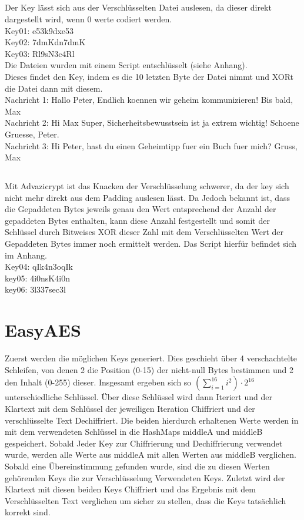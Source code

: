 \documentclass[12pt]{article}
\theoremstyle{plain}
\begin{document}
\subsection{}
Der Key lässt sich aus der Verschlüsselten Datei auslesen, da dieser direkt dargestellt wird, wenn 0 werte codiert werden.\\
Key01: e53k9dxe53\\
Key02: 7dmKdn7dmK\\
Key03: Rl9sN3c4Rl\\
Die Dateien wurden mit einem Script entschlüsselt (siehe Anhang).\\
Dieses findet den Key, indem es die 10 letzten Byte der Datei nimmt und XORt die Datei dann mit diesem.\\
Nachricht 1: Hallo Peter, Endlich koennen wir geheim kommunizieren! Bis bald, Max\\
Nachricht 2: Hi Max Super, Sicherheitsbewusstsein ist ja extrem wichtig! Schoene Gruesse, Peter.\\
Nachricht 3: Hi Peter, hast du einen Geheimtipp fuer ein Buch fuer mich? Gruss, Max\\
\subsection{}
Mit Advazicrypt ist das Knacken der Verschlüsselung schwerer, da der key sich nicht mehr direkt aus dem Padding auslesen lässt. Da Jedoch bekannt ist, dass die Gepaddeten Bytes jeweils genau den Wert entsprechend der Anzahl der gepaddeten Bytes enthalten, kann diese Anzahl festgestellt und somit der Schlüssel durch Bitweises XOR dieser Zahl mit dem Verschlüsselten Wert der Gepaddeten Bytes immer noch ermittelt werden. Das Script hierfür befindet sich im Anhang.\\
Key04: qIk4n3oqIk\\
key05: 4i0nsK4i0n\\
key06: 3l337sec3l\\
\section{EasyAES}
Zuerst werden die möglichen Keys generiert. Dies geschieht über 4 verschachtelte Schleifen, von denen 2 die Position (0-15) der nicht-null Bytes bestimmen und 2 den Inhalt (0-255) dieser. Insgesamt ergeben sich so $(\sum_{i=1}^{16} i^2)\cdot 2^{16}$ unterschiedliche Schlüssel. Über diese Schlüssel wird dann Iteriert und der Klartext mit dem Schlüssel der jeweiligen Iteration Chiffriert und der verschlüsselte Text Dechiffriert. Die beiden hierdurch erhaltenen Werte werden in mit dem verwendeten Schlüssel in die HashMaps middleA und middleB gespeichert. Sobald Jeder Key zur Chiffrierung und Dechiffrierung verwendet wurde, werden alle Werte aus middleA mit allen Werten aus middleB verglichen. Sobald eine Übereinstimmung gefunden wurde, sind die zu diesen Werten gehörenden Keys die zur Verschlüsselung Verwendeten Keys. Zuletzt wird der Klartext mit diesen beiden Keys Chiffriert und das Ergebnis mit dem Verschlüsselten Text verglichen um sicher zu stellen, dass die Keys tatsächlich korrekt sind.
\end{document}
